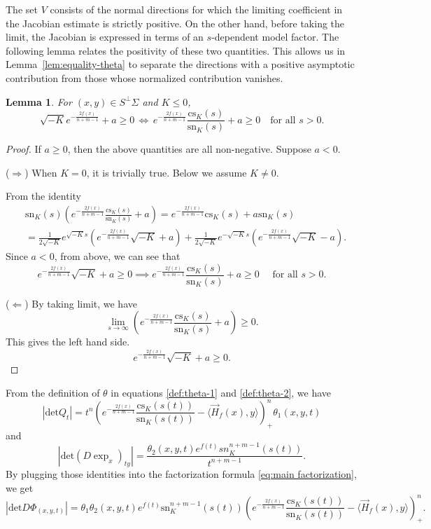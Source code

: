 \documentclass[psamsfonts]{amsart}
\newtheorem{lem}[thm]{Lemma}
\theoremstyle{definition}
\theoremstyle{remark}
\numberwithin{equation}{section}
\begin{document}
The set $V$ consists of the normal directions for which the limiting coefficient in the Jacobian estimate is strictly positive. On the other hand, before taking the limit, the Jacobian is expressed in terms of an $s$-dependent model factor. The following lemma relates the positivity of these two quantities. This allows us in Lemma~\ref{lem:equality-theta} to separate the directions with a positive asymptotic contribution from those whose normalized contribution vanishes.
\begin{lem}\label{lem:equality-setv}
    For $(x,y) \in S^\perp \Sigma$ and $K \leq 0$,
    $$\sqrt{ - K }e^{ - \frac{2f(x)}{n+m-1}} + a \geq 0 \, \iff \, e^{- \frac{2f(x)}{n+m-1}} \frac{\mathrm{cs}_K (s)}{\mathrm{sn}_K(s)} + a  \geq 0 \quad \text{for all } s >0.$$
\end{lem}
\begin{proof}
    If $a \geq 0$, then the above quantities are all non-negative.
    Suppose $a < 0$.

    ($\Rightarrow$) When $K =0$, it is trivially true. Below we assume $K \not= 0$.
    
    From the identity
    \begin{align*}
        & \mathrm{sn}_K(s) \left( e^{-\frac{2f(x)}{n+m-1}} \frac{\mathrm{cs}_K (s)}{\mathrm{sn}_K(s)} + a \right) = e^{-\frac{2f(x)}{n+m-1}} \mathrm{cs}_K(s) + a \mathrm{sn}_K (s) \\
        & = \frac{1}{2\sqrt{-K}} e^{\sqrt{-K}s} \left( e^{-\frac{2f(x)}{n+m-1}} \sqrt{-K} +a\right) + \frac{1}{2\sqrt{-K}}e^{-\sqrt{-K}s} \left( e^{-\frac{2f(x)}{n+m-1}} \sqrt{-K} -a\right).
    \end{align*}
   Since $a <0$, from above, we can see that
    $$e^{- \frac{2f(x)}{n+m-1}} \sqrt{-K} + a \geq 0 \implies e^{- \frac{2f(x)}{n+m-1}} \frac{\mathrm{cs}_K (s)}{\mathrm{sn}_K(s)} + a  \geq 0 \quad \text{ for all }s >0.$$

    ($\Leftarrow$) 
    By taking limit, we have
    $$\lim_{s \to \infty} \left( e^{- \frac{2f(x)}{n+m-1}} \frac{\mathrm{cs}_K(s)}{\mathrm{sn}_K(s)} + a\right) \geq 0 .$$
    This gives the left hand side. 
    $$e^{- \frac{2f(x)}{n+m-1}}\sqrt{-K} + a \geq 0.$$
\end{proof}
From the definition of $\theta$ in equations \eqref{def:theta-1} and \eqref{def:theta-2}, we have
$$|\mathrm{det} Q_t| = t^n \left( e^{-\frac{2f(x)}{n+m-1}}\frac{\mathrm{cs}_K(s(t))}{\mathrm{sn}_K(s(t))} - \langle \vec H_f (x), y \rangle \right)_+^n \theta_1 (x,y,t)$$
and
$$|\mathrm{det} (D \exp_x )_{ty} | = \frac{\theta_2(x,y,t) e^{f(t)} sn_K^{n+m-1} (s(t))}{t^{n+m-1}}.$$
By plugging those identities into the factorization formula \eqref{eq:main factorization}, we get
$$|\mathrm{det} D\Phi_{(x,y,t)}| = \theta_1 \theta_2 (x,y,t) e^{f(t)} \mathrm{sn}_K^{n+m-1}(s(t)) \left( e^{-\frac{2f(x)}{n+m-1}} \frac{\mathrm{cs}_K(s(t))}{\mathrm{sn}_K(s(t))} - \langle \vec H_f (x), y \rangle \right)_+^n.$$
\end{document}
